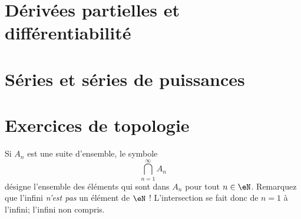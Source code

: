 






					\section{Dérivées partielles et différentiabilité}



					\section{Séries et séries de puissances}



					\section{Exercices de topologie}

Si $A_n$ est une suite d'ensemble, le symbole
\begin{equation}
	\bigcap_{n=1}^{\infty}A_n
\end{equation}
désigne l'ensemble des éléments qui sont dans $A_n$ pour tout $n\in\eN$. Remarquez que l'infini \emph{n'est pas} un élément de $\eN$ ! L'intersection se fait donc de $n=1$ à l'infini; l'infini non compris.

